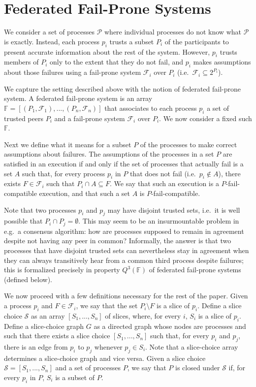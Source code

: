 \documentclass[11pt]{article}
\begin{document}
\section{Federated Fail-Prone Systems}
\label{sec:basic}

We consider a set of processes $\mathcal{P}$ where individual processes do not know what $\mathcal{P}$ is exactly.
Instead, each process $p_i$ trusts a subset $P_i$ of the participants to present accurate information about the rest of the system.
However, $p_i$ trusts members of $P_i$ only to the extent that they do not fail, and $p_i$ makes assumptions about those failures using a fail-prone system $\mathcal{F}_i$ over $P_i$ (i.e.\ $\mathcal{F}_i\subseteq 2^{P_i}$).

We capture the setting described above with the notion of federated fail-prone system. A federated fail-prone system is an array $\mathbb{F}=\left[\left(P_1,\mathcal{F}_1\right),...,\left(P_n,\mathcal{F}_n\right)\right]$ that associates to each process $p_i$ a set of trusted peers $P_i$ and a fail-prone system $\mathcal{F}_i$ over $P_i$.
We now consider a fixed such $\mathbb{F}$.

Next we define what it means for a subset $P$ of the processes to make correct assumptions about failures.
The assumptions of the processes in a set $P$ are satisfied in an execution if and only if the set of processes that actually fail is a set $A$ such that, for every process $p_i$ in $P$ that does not fail (i.e.\ $p_i\not\in A$), there exists $F\in\mathcal{F}_i$ such that $P_i\cap A \subseteq F$.
We say that such an execution is a $P$-fail-compatible execution, and that such a set $A$ is $P$-fail-compatible.

Note that two processes $p_i$ and $p_j$ may have disjoint trusted sets, i.e.\ it is well possible that $P_i\cap P_j=\emptyset$.
This may seem to be an insurmountable problem in e.g.\ a consensus algorithm: how are processes supposed to remain in agreement despite not having any peer in common? Informally, the answer is that two processes that have disjoint trusted sets can nevertheless stay in agreement when they can always transitively hear from a common third process despite failures; this is formalized precisely in property $Q^3(\mathbb{F})$ of federated fail-prone systems (defined below).

We now proceed with a few definitions necessary for the rest of the paper.
Given a process $p_i$ and $F\in \mathcal{F}_i$, we say that the set $P_i\setminus F$ is a slice of $p_i$.
Define a slice choice $\mathcal{S}$ as an array $\left[S_1,...,S_n\right]$ of slices, where, for every $i$, $S_i$ is a slice of $p_i$.
Define a slice-choice graph $G$ as a directed graph whose nodes are processes and such that there exists a slice choice $\left[S_1,...,S_n\right]$ such that, for every $p_i$ and $p_j$, there is an edge from $p_i$ to $p_j$ whenever $p_j\in S_i$. Note that a slice-choice array determines a slice-choice graph and vice versa.
Given a slice choice $\mathcal{S}=\left[S_1,...,S_n\right]$ and a set of processes $P$, we say that $P$ is closed under $\mathcal{S}$ if, for every $p_i$ in $P$, $S_i$ is a subset of $P$.
\end{document}
